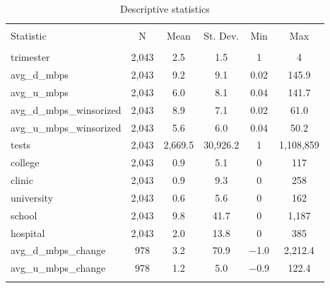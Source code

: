 
\begin{table}[!htbp] \centering 
  \caption{Descriptive statistics} 
  \label{} 
\begin{tabular}{@{\extracolsep{5pt}}lccccc} 
\\[-1.8ex]\hline 
\hline \\[-1.8ex] 
Statistic & \multicolumn{1}{c}{N} & \multicolumn{1}{c}{Mean} & \multicolumn{1}{c}{St. Dev.} & \multicolumn{1}{c}{Min} & \multicolumn{1}{c}{Max} \\ 
\hline \\[-1.8ex] 
trimester & 2,043 & 2.5 & 1.5 & 1 & 4 \\ 
avg\_d\_mbps & 2,043 & 9.2 & 9.1 & 0.02 & 145.9 \\ 
avg\_u\_mbps & 2,043 & 6.0 & 8.1 & 0.04 & 141.7 \\ 
avg\_d\_mbps\_winsorized & 2,043 & 8.9 & 7.1 & 0.02 & 61.0 \\ 
avg\_u\_mbps\_winsorized & 2,043 & 5.6 & 6.0 & 0.04 & 50.2 \\ 
tests & 2,043 & 2,669.5 & 30,926.2 & 1 & 1,108,859 \\ 
college & 2,043 & 0.9 & 5.1 & 0 & 117 \\ 
clinic & 2,043 & 0.9 & 9.3 & 0 & 258 \\ 
university & 2,043 & 0.6 & 5.6 & 0 & 162 \\ 
school & 2,043 & 9.8 & 41.7 & 0 & 1,187 \\ 
hospital & 2,043 & 2.0 & 13.8 & 0 & 385 \\ 
avg\_d\_mbps\_change & 978 & 3.2 & 70.9 & $-$1.0 & 2,212.4 \\ 
avg\_u\_mbps\_change & 978 & 1.2 & 5.0 & $-$0.9 & 122.4 \\ 
\hline \\[-1.8ex] 
\end{tabular} 
\end{table} 
